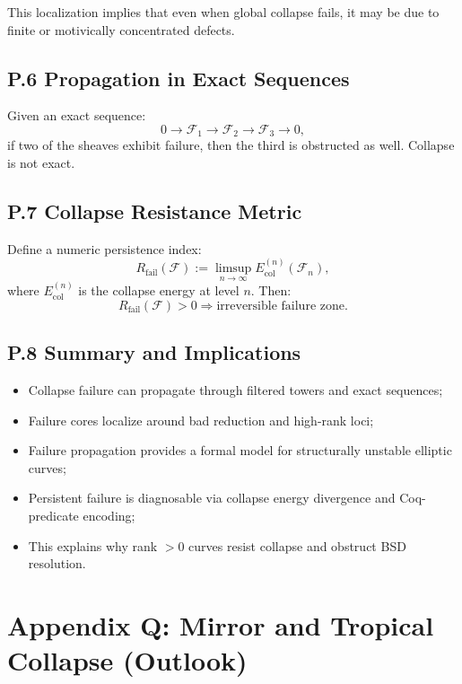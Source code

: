 \documentclass[11pt]{article}
\begin{document}
This localization implies that even when global collapse fails, it may be due to finite or motivically concentrated defects.

\subsection*{P.6 Propagation in Exact Sequences}

Given an exact sequence:
\[
0 \to \mathcal{F}_1 \to \mathcal{F}_2 \to \mathcal{F}_3 \to 0,
\]
if two of the sheaves exhibit failure, then the third is obstructed as well. Collapse is not exact.

\subsection*{P.7 Collapse Resistance Metric}

Define a numeric persistence index:
\[
R_{\mathrm{fail}}(\mathcal{F}) := \limsup_{n \to \infty} E_{\mathrm{col}}^{(n)}(\mathcal{F}_n),
\]
where \( E_{\mathrm{col}}^{(n)} \) is the collapse energy at level \( n \). Then:
\[
R_{\mathrm{fail}}(\mathcal{F}) > 0 \Rightarrow \text{irreversible failure zone}.
\]

\subsection*{P.8 Summary and Implications}

\begin{itemize}
  \item Collapse failure can propagate through filtered towers and exact sequences;
  \item Failure cores localize around bad reduction and high-rank loci;
  \item Failure propagation provides a formal model for structurally unstable elliptic curves;
  \item Persistent failure is diagnosable via collapse energy divergence and Coq-predicate encoding;
  \item This explains why rank \( > 0 \) curves resist collapse and obstruct BSD resolution.
\end{itemize}



\appendix
\section*{Appendix Q: Mirror and Tropical Collapse (Outlook)}
\end{document}
